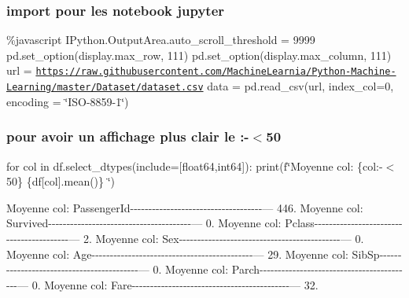 \subsubsection*{import pour les notebook jupyter}

\%javascript I\+Python.\+Output\+Area.\+auto\+\_\+scroll\+\_\+threshold = 9999 pd.\+set\+\_\+option(\textquotesingle{}display.\+max\+\_\+row\textquotesingle{}, 111) pd.\+set\+\_\+option(\textquotesingle{}display.\+max\+\_\+column\textquotesingle{}, 111) url = \textquotesingle{}\href{https://raw.githubusercontent.com/MachineLearnia/Python-Machine-Learning/master/Dataset/dataset.csv'}{\tt https\+://raw.\+githubusercontent.\+com/\+Machine\+Learnia/\+Python-\/\+Machine-\/\+Learning/master/\+Dataset/dataset.\+csv\textquotesingle{}} data = pd.\+read\+\_\+csv(url, index\+\_\+col=0, encoding = \char`\"{}\+I\+S\+O-\/8859-\/1\char`\"{})

\subsubsection*{pour avoir un affichage plus clair le \+:-\/$<$50}

for col in df.\+select\+\_\+dtypes(include=\mbox{[}\textquotesingle{}float64\textquotesingle{},\textquotesingle{}int64\textquotesingle{}\mbox{]})\+: print(f\char`\"{}\+Moyenne col\+: \{col\+:-\/$<$50\}  \{df\mbox{[}col\mbox{]}.\+mean()\} \char`\"{})

Moyenne col\+: Passenger\+Id-\/-\/-\/-\/-\/-\/-\/-\/-\/-\/-\/-\/-\/-\/-\/-\/-\/-\/-\/-\/-\/-\/-\/-\/-\/-\/-\/-\/-\/-\/-\/-\/-\/-\/-\/-\/--- 446. Moyenne col\+: Survived-\/-\/-\/-\/-\/-\/-\/-\/-\/-\/-\/-\/-\/-\/-\/-\/-\/-\/-\/-\/-\/-\/-\/-\/-\/-\/-\/-\/-\/-\/-\/-\/-\/-\/-\/-\/-\/-\/-\/--- 0. Moyenne col\+: Pclass-\/-\/-\/-\/-\/-\/-\/-\/-\/-\/-\/-\/-\/-\/-\/-\/-\/-\/-\/-\/-\/-\/-\/-\/-\/-\/-\/-\/-\/-\/-\/-\/-\/-\/-\/-\/-\/-\/-\/-\/-\/--- 2. Moyenne col\+: Sex-\/-\/-\/-\/-\/-\/-\/-\/-\/-\/-\/-\/-\/-\/-\/-\/-\/-\/-\/-\/-\/-\/-\/-\/-\/-\/-\/-\/-\/-\/-\/-\/-\/-\/-\/-\/-\/-\/-\/-\/-\/-\/-\/-\/--- 0. Moyenne col\+: Age-\/-\/-\/-\/-\/-\/-\/-\/-\/-\/-\/-\/-\/-\/-\/-\/-\/-\/-\/-\/-\/-\/-\/-\/-\/-\/-\/-\/-\/-\/-\/-\/-\/-\/-\/-\/-\/-\/-\/-\/-\/-\/-\/-\/--- 29. Moyenne col\+: Sib\+Sp-\/-\/-\/-\/-\/-\/-\/-\/-\/-\/-\/-\/-\/-\/-\/-\/-\/-\/-\/-\/-\/-\/-\/-\/-\/-\/-\/-\/-\/-\/-\/-\/-\/-\/-\/-\/-\/-\/-\/-\/-\/-\/--- 0. Moyenne col\+: Parch-\/-\/-\/-\/-\/-\/-\/-\/-\/-\/-\/-\/-\/-\/-\/-\/-\/-\/-\/-\/-\/-\/-\/-\/-\/-\/-\/-\/-\/-\/-\/-\/-\/-\/-\/-\/-\/-\/-\/-\/-\/-\/--- 0. Moyenne col\+: Fare-\/-\/-\/-\/-\/-\/-\/-\/-\/-\/-\/-\/-\/-\/-\/-\/-\/-\/-\/-\/-\/-\/-\/-\/-\/-\/-\/-\/-\/-\/-\/-\/-\/-\/-\/-\/-\/-\/-\/-\/-\/-\/-\/--- 32.

